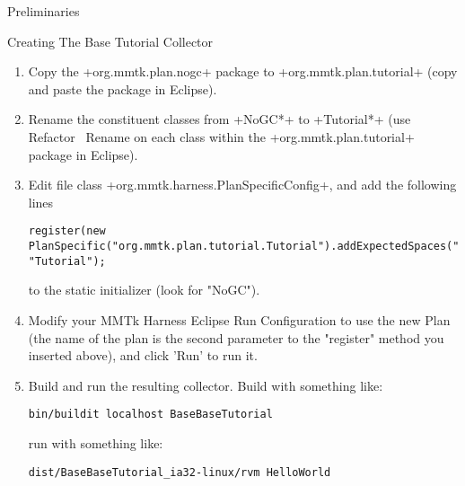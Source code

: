 \begin{section}{Preliminaries}
\begin{subsection}{Creating The Base Tutorial Collector}
\begin{enumerate}
  \item Copy the \spverb+org.mmtk.plan.nogc+ package to \spverb+org.mmtk.plan.tutorial+ (copy and paste the package in Eclipse).
  \item Rename the constituent classes from \spverb+NoGC*+ to \spverb+Tutorial*+ (use Refactor \textrightarrow\ Rename on each class within the \spverb+org.mmtk.plan.tutorial+ package in Eclipse).
  \item Edit file class \spverb+org.mmtk.harness.PlanSpecificConfig+, and add the following lines 
     \begin{lstlisting}[breakatwhitespace=false]
register(new PlanSpecific("org.mmtk.plan.tutorial.Tutorial").addExpectedSpaces("default"), "Tutorial");
     \end{lstlisting}
to the static initializer (look for "NoGC").
  \item Modify your MMTk Harness Eclipse Run Configuration to use the new Plan (the name of the plan is the second parameter to the "register" method you inserted above), and click 'Run' to run it.
  \item Build and run the resulting collector. \newline Build with something like:
    \begin{lstlisting}
bin/buildit localhost BaseBaseTutorial
    \end{lstlisting}
    run with something like:
    \begin{lstlisting}
dist/BaseBaseTutorial_ia32-linux/rvm HelloWorld
    \end{lstlisting}
\end{enumerate}

\end{subsection}

\end{section}
